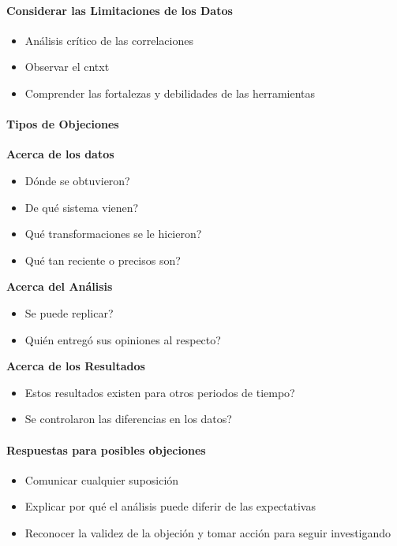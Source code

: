 \paragraph{Considerar las Limitaciones de los Datos}
\begin{itemize}
    \item {Análisis crítico de las correlaciones}
    \item {Observar el \gls{cntxt}}
    \item {Comprender las fortalezas y debilidades de las herramientas}
\end{itemize}

\paragraph{Tipos de Objeciones}
\textbf{Acerca de los datos}
\begin{itemize}
    \item {Dónde se obtuvieron?}
    \item {De qué sistema vienen?}
    \item {Qué transformaciones se le hicieron?}
    \item {Qué tan reciente o precisos son?}
\end{itemize}
\textbf{Acerca del Análisis}
\begin{itemize}
    \item {Se puede replicar?}
    \item {Quién entregó sus opiniones al respecto?}
\end{itemize}
\textbf{Acerca de los Resultados}
\begin{itemize}
    \item {Estos resultados existen para otros periodos de tiempo?}
    \item {Se controlaron las diferencias en los datos?}
\end{itemize}

\paragraph{Respuestas para posibles objeciones}
\begin{itemize}
    \item {Comunicar cualquier suposición}
    \item {Explicar por qué el análisis puede diferir de las expectativas}
    \item {Reconocer la validez de la objeción y tomar acción para seguir investigando}
\end{itemize}


